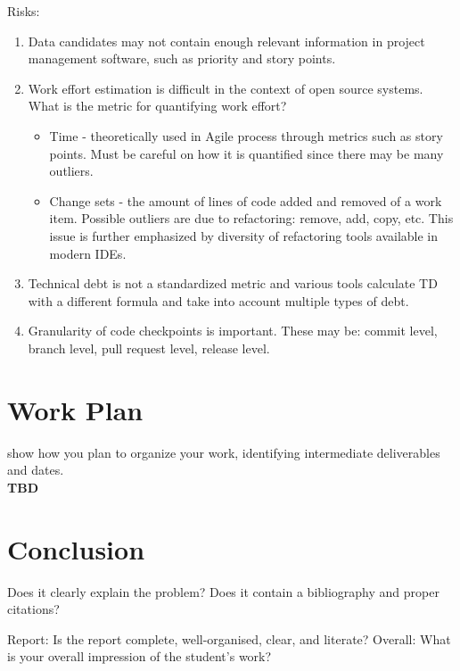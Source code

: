 \documentclass{mprop}
\begin{document}
Risks:
\begin{enumerate}
	\item Data candidates may not contain enough relevant information in
	project management software, such as priority and story points.
	\item Work effort estimation is difficult in the context of open source
	systems. What is the metric for quantifying work effort?
	      \begin{itemize}
		      \item Time - theoretically used in Agile process through
		            metrics such as story points. Must be careful on how it
		            is quantified since there may be many outliers.
		      \item Change sets - the amount of lines of code added and
		            removed of a work item. Possible outliers are due to
		            refactoring: remove, add, copy, etc. This issue is
		            further emphasized by diversity of refactoring tools
		            available in modern IDEs.
	      \end{itemize}
	\item Technical debt is not a standardized metric and various tools
	calculate TD with a different formula and take into account multiple types
	of debt.
	\item Granularity of code checkpoints is important. These may be: commit
	level, branch level, pull request level, release level.
\end{enumerate}

\section{Work Plan}

show how you plan to organize your work, identifying intermediate deliverables
and dates.\\
\textbf{TBD}

\section{Conclusion}

Does it clearly explain the problem? Does it contain a bibliography and proper
citations?

Report: Is the report complete, well-organised, clear, and literate? Overall:
What is your overall impression of the student’s work?



\end{document}
